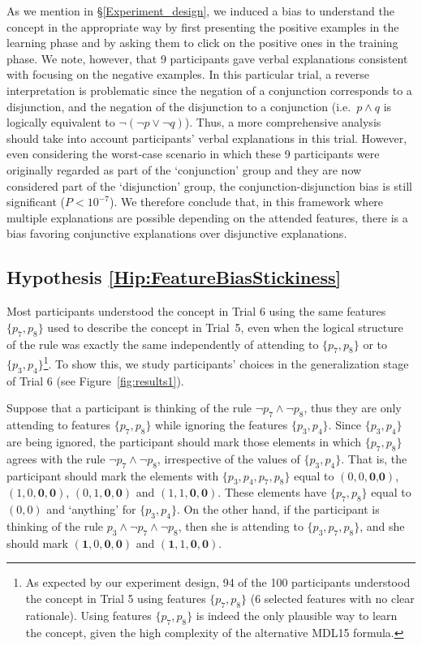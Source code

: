 As we mention in \S\ref{Experiment_design}, we induced a bias to understand the concept in the appropriate way by first presenting the positive examples in the learning phase and by asking them to click on the positive ones in the training phase. We note, however, that 9 participants gave verbal explanations consistent with focusing on the negative examples. In this particular trial, a reverse interpretation is problematic since the negation of a conjunction corresponds to a disjunction, and the negation of the disjunction to a conjunction (i.e.\ $p\land q$ is logically equivalent to $\lnot(\lnot p\lor \lnot q)$). Thus, a more comprehensive analysis should take into account participants' verbal explanations in this trial. However, even considering the worst-case scenario in which these 9 participants were originally regarded as part of the `conjunction' group and they are now considered part of the `disjunction' group, the conjunction-disjunction bias is still significant ($P<10^{-7}$). We therefore conclude that, in this framework where multiple explanations are possible depending on the attended features, there is a bias favoring conjunctive explanations over disjunctive explanations. 

\subsection{Hypothesis \ref{Hip:FeatureBiasStickiness}}\label{Results:FeatureBiasStickiness}   
Most participants understood the concept in Trial 6 using the same features $\{p_7,p_8\}$ used to describe the concept in Trial~5, even when the logical structure of the rule was exactly the same independently of attending to $\{p_7,p_8\}$ or to $\{p_3,p_4\}$\footnote{As expected by our experiment design, 94 of the 100 participants understood the concept in Trial 5 using features $\{p_7,p_8\}$ (6 selected features with no clear rationale). Using features $\{p_7,p_8\}$ is indeed the only plausible way to learn the concept, given the high complexity of the alternative MDL15 formula. }. To show this, we study participants' choices in the generalization stage of Trial 6 (see Figure~\ref{fig:results1}). 

Suppose that a participant is thinking of the rule $\lnot p_7 \land \lnot p_8$, thus they are only attending to features $\{p_7,p_8\}$ while ignoring the features $\{p_3,p_4\}$. Since $\{p_3,p_4\}$ are being ignored, the participant should mark those elements in which $\{p_7,p_8\}$ agrees with the rule $\lnot p_7 \land \lnot p_8$, irrespective of the values of $\{p_3,p_4\}$. That is, the participant should mark the elements with $\{p_3,p_4,p_7,p_8\}$ equal to $(0,0,\textbf{0,0})$, $(1,0,\textbf{0},\textbf{0})$, $(0,1,\textbf{0},\textbf{0})$ and $(1,1,\textbf{0},\textbf{0})$. These elements have $\{p_7,p_8\}$ equal to $(0,0)$ and `anything' for $\{p_3,p_4\}$. On the other hand, if the participant is thinking of the rule $p_3 \land \lnot p_7 \land \lnot p_8$, then she is attending to $\{p_3,p_7,p_8\}$, and she should mark $(\textbf{1},0,\textbf{0},\textbf{0})$ and $(\textbf{1},1,\textbf{0},\textbf{0})$. 

